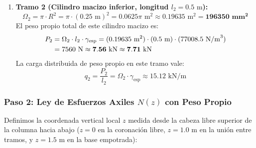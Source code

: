 \begin{enumerate}
    \item \textbf{Tramo 2 (Cilindro macizo inferior, longitud $l_2 = 0.5\text{ m}$):}
          \begin{equation}
              \Omega_2 = \pi \cdot R^2 = \pi \cdot (0.25\text{ m})^2 = 0.0625\pi\text{ m}^2 \approx 0.19635\text{ m}^2 = \mathbf{196350\text{ mm}^2}
          \end{equation}
          El peso propio total de este cilindro macizo es:
          \begin{align}
              P_2 & = \Omega_2 \cdot l_2 \cdot \gamma_{\text{esp}} = (0.19635\text{ m}^2) \cdot (0.5\text{ m}) \cdot (77008.5\text{ N/m}^3) \notag \\
                  & = 7560\text{ N} \approx \mathbf{7.56\text{ kN} \approx 7.71\text{ kN}}
          \end{align}
          La carga distribuida de peso propio en este tramo vale:
          \begin{equation}
              q_2 = \frac{P_2}{l_2} = \Omega_2 \cdot \gamma_{\text{esp}} \approx 15.12\text{ kN/m}
          \end{equation}
\end{enumerate}

\subsubsection*{Paso 2: Ley de Esfuerzos Axiles $N(z)$ con Peso Propio}
Definimos la coordenada vertical local $z$ medida desde la cabeza libre superior de la columna hacia abajo ($z = 0$ en la coronación libre, $z = 1.0\text{ m}$ en la unión entre tramos, y $z = 1.5\text{ m}$ en la base empotrada):

